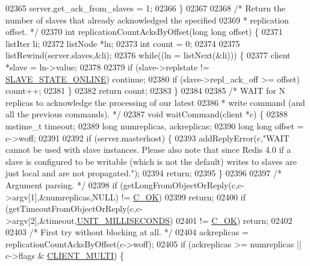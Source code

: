 \begin{DoxyCode}
{{{{{{{{{{{{{{{{{{{{{{{{{{{{{{{{{{{{{{{{{{{{{{{{{{{{{{{{{{{{{{{{{{{{{{{{{{{02365     server.get\_ack\_from\_slaves = 1;
02366 \}
02367 
02368 \textcolor{comment}{/* Return the number of slaves that already acknowledged the specified}
02369 \textcolor{comment}{ * replication offset. */}
02370 \textcolor{keywordtype}{int} replicationCountAcksByOffset(\textcolor{keywordtype}{long} \textcolor{keywordtype}{long} offset) \{
02371     listIter li;
02372     listNode *ln;
02373     \textcolor{keywordtype}{int} count = 0;
02374 
02375     listRewind(server.slaves,&li);
02376     \textcolor{keywordflow}{while}((ln = listNext(&li))) \{
02377         client *slave = ln->value;
02378 
02379         \textcolor{keywordflow}{if} (slave->replstate != \hyperlink{server_8h_ad895fdf16e5ed5275d19ddf8578b900f}{SLAVE\_STATE\_ONLINE}) \textcolor{keywordflow}{continue};
02380         \textcolor{keywordflow}{if} (slave->repl\_ack\_off >= offset) count++;
02381     \}
02382     \textcolor{keywordflow}{return} count;
02383 \}
02384 
02385 \textcolor{comment}{/* WAIT for N replicas to acknowledge the processing of our latest}
02386 \textcolor{comment}{ * write command (and all the previous commands). */}
02387 \textcolor{keywordtype}{void} waitCommand(client *c) \{
02388     mstime\_t timeout;
02389     \textcolor{keywordtype}{long} numreplicas, ackreplicas;
02390     \textcolor{keywordtype}{long} \textcolor{keywordtype}{long} offset = c->woff;
02391 
02392     \textcolor{keywordflow}{if} (server.masterhost) \{
02393         addReplyError(c,\textcolor{stringliteral}{"WAIT cannot be used with slave instances. Please also note that since Redis
       4.0 if a slave is configured to be writable (which is not the default) writes to slaves are just local and
       are not propagated."});
02394         \textcolor{keywordflow}{return};
02395     \}
02396 
02397     \textcolor{comment}{/* Argument parsing. */}
02398     \textcolor{keywordflow}{if} (getLongFromObjectOrReply(c,c->argv[1],&numreplicas,NULL) != \hyperlink{server_8h_a303769ef1065076e68731584e758d3e1}{C\_OK})
02399         \textcolor{keywordflow}{return};
02400     \textcolor{keywordflow}{if} (getTimeoutFromObjectOrReply(c,c->argv[2],&timeout,\hyperlink{server_8h_a259de972533409a75b736bfc799a8e2d}{UNIT\_MILLISECONDS})
02401         != \hyperlink{server_8h_a303769ef1065076e68731584e758d3e1}{C\_OK}) \textcolor{keywordflow}{return};
02402 
02403     \textcolor{comment}{/* First try without blocking at all. */}
02404     ackreplicas = replicationCountAcksByOffset(c->woff);
02405     \textcolor{keywordflow}{if} (ackreplicas >= numreplicas || c->flags & \hyperlink{server_8h_a7f61f783f429419f8c593291a509b03a}{CLIENT\_MULTI}) \{
}}}}}}}}}}}}}}}}}}}}}}}}}}}}}}}}}}}}}}}}}}}}}}}}}}}}}}}}}}}}}}}}}}}}}}}}}}}
\end{DoxyCode}
